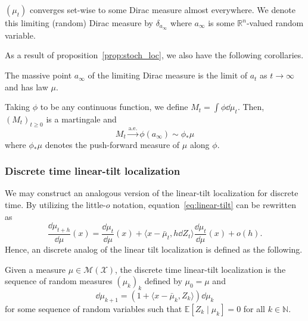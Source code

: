 \begin{corollary}
  \((\mu_t)\) converges set-wise to some Dirac measure almost everywhere. We denote this 
  limiting (random) Dirac measure by \(\delta_{a_\infty}\) where \(a_\infty\) is some 
  \(\mathbb{R}^n\)-valued random variable.
\end{corollary}

As a result of proposition~\ref{prop:stoch_loc}, we also have the following corollaries.

\begin{corollary}\label{cor:lim_dis}
  The massive point \(a_\infty\) of the limiting Dirac measure is the limit of \(a_t\) as 
  \(t \to \infty\) and has law \(\mu\).
\end{corollary}

\begin{corollary}\label{cor:lim_mart}
  Taking \(\phi\) to be any continuous function, we define \(M_t = \int \phi \dd\mu_t\). Then,
  \((M_t)_{t \ge 0}\) is a martingale and
  \begin{equation}\label{eq:lim_mart}
    M_t \xrightarrow{\text{a.e.}} \phi(a_\infty) \sim \phi_* \mu
  \end{equation}
  where \(\phi_*\mu\) denotes the push-forward measure of \(\mu\) along \(\phi\).
\end{corollary}

\subsubsection{Discrete time linear-tilt localization}\label{sec:discrete_tilt}

We may construct an analogous version of the linear-tilt localization for discrete time. By utilizing 
the little-\(o\) notation, equation~\eqref{eq:linear-tilt} can be rewritten as 
\[\frac{\dd \mu_{t + h}}{\dd \mu}(x) = 
  \frac{\dd \mu_t}{\dd \mu}(x) + \langle x - \bar{\mu}_t, h\dd Z_t\rangle \frac{\dd \mu_t}{\dd \mu}(x) 
  + o(h).\]
Hence, an discrete analog of the linear tilt localization is defined as the following.

\begin{definition}
  Given a measure \(\mu \in \mathcal{M}(\mathcal{X})\), the discrete time linear-tilt localization 
  is the sequence of random measures \((\mu_k)_k\) defined by \(\mu_0 = \mu\) and 
  \begin{equation}\label{eq:discrete_tilt}
    \dd \mu_{k + 1} = (1 + \langle x - \bar{\mu}_k, Z_k \rangle)\dd \mu_k
  \end{equation} 
  for some sequence of random variables such that \(\mathbb{E}[Z_k \mid \mu_k] = 0\) for all 
  \(k \in \mathbb{N}\).
\end{definition}

